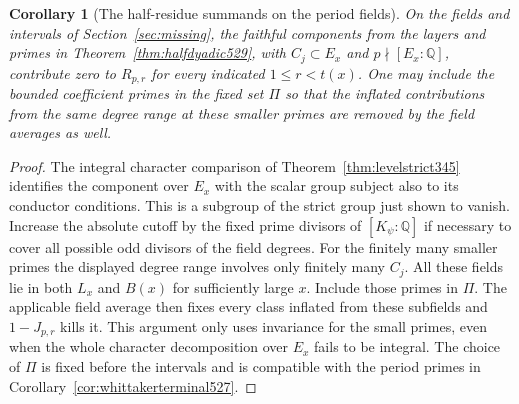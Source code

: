 \documentclass[a4paper,11pt]{article}
\newtheorem{corollary}[proposition]{Corollary}
\theoremstyle{definition}
\theoremstyle{remark}
\numberwithin{equation}{section}
\begin{document}
\begin{corollary}[The half-residue summands on the period fields]
\leavevmode\label{cor:periodhalf529}
On the fields and intervals of Section~\ref{sec:missing}, the
faithful components from the layers and primes in
Theorem~\ref{thm:halfdyadic529}, with \(C_j\subset E_x\) and
\(p\nmid [E_x:\mathbb Q]\), contribute zero to \(R_{p,r}\) for
every indicated \(1\le r<t(x)\). One may include the bounded
coefficient primes in the fixed set \(\Pi\) so that the inflated
contributions from the same degree range at these smaller primes
are removed by the field averages as well.
\end{corollary}
\begin{proof}
The integral character comparison of Theorem~\ref{thm:levelstrict345}
identifies the component over \(E_x\) with the scalar group subject
also to its conductor conditions. This is a subgroup of the strict
group just shown to vanish. Increase the absolute cutoff by the
fixed prime divisors of \([K_\psi:\mathbb Q]\) if necessary to
cover all possible odd divisors of the field degrees. For the
finitely many smaller primes the displayed degree range involves
only finitely many \(C_j\). All these fields lie in both \(L_x\)
and \(B(x)\) for sufficiently large \(x\). Include those primes
in \(\Pi\). The applicable field average then fixes every class
inflated from these subfields and \(1-J_{p,r}\) kills it.
This argument only uses invariance for the small primes, even when
the whole character decomposition over \(E_x\) fails to be integral.
The choice of \(\Pi\) is fixed before the intervals and is
compatible with the period primes in
Corollary~\ref{cor:whittakerterminal527}.
\end{proof}
\end{document}
